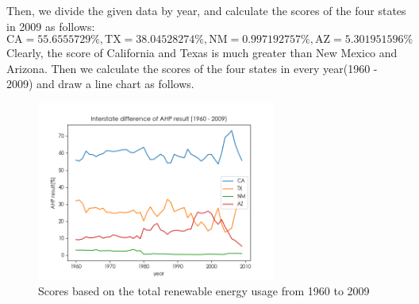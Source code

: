 \documentclass[a4paper,11pt]{article}
\begin{document}
\par Then, we divide the given data by year, and calculate the scores of the four states in 2009 as follows:
\[
    \text{CA}=55.6555729\%, \text{TX}=38.04528274\%, \text{NM}=0.997192757\%, \text{AZ}=5.301951596\%
\]
Clearly, the score of California and Texas is much greater than New Mexico and Arizona.
Then we calculate the scores of the four states in every year(1960 - 2009) and draw a line chart as follows.
\begin{figure}[!hptb] 
    \centering 
    \includegraphics[width=0.7\textwidth]{./Pic/B-level-predict.png}
    \caption{Scores based on the total renewable energy usage from 1960 to 2009}
    \label{fig:B-level-predict}
\end{figure}

\end{document}
